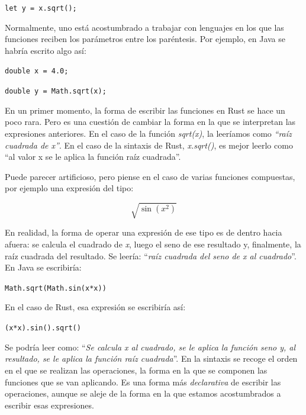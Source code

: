 {\vspace{-0.7em}\hspace{5em} \texttt{let y = x.sqrt();} \par}

Normalmente, uno está acostumbrado a trabajar con lenguajes en los que las funciones reciben los parámetros entre los paréntesis. Por ejemplo, en Java se habría escrito algo así:

{\hspace{5em} \texttt{double x = 4.0;} \par}

{\vspace{-0.7em}\hspace{5em} \texttt{double y = Math.sqrt(x);} \par}

En un primer momento, la forma de escribir las funciones en Rust se hace un poco rara. Pero es una cuestión de cambiar la forma en la que se interpretan las expresiones anteriores. En el caso de la función \textit{sqrt(x)}, la leeríamos como \textit{``raíz cuadrada de x''}. En el caso de la sintaxis de Rust, \textit{x.sqrt()}, es mejor leerlo como ``al valor x se le aplica la función raíz cuadrada''. 

Puede parecer artificioso, pero piense en el caso de varias funciones compuestas, por ejemplo una expresión del tipo:

\[\sqrt{\sin{(x^2)}}\]

En realidad, la forma de operar una expresión de ese tipo es de dentro hacia afuera: se calcula el cuadrado de \textit{x}, luego el seno de ese resultado y, finalmente, la raíz cuadrada del resultado. Se leería: ``\textit{raíz cuadrada del seno de x al cuadrado}''. En Java se escribiría:

{\centering \texttt{Math.sqrt(Math.sin(x*x))} \par}


En el caso de Rust, esa expresión se escribiría así:

{\centering \texttt{(x*x).sin().sqrt()} \par}
 
Se podría leer como: ``\textit{Se calcula x al cuadrado, se le aplica la función seno y, al resultado, se le aplica la función raíz cuadrada}''. En la sintaxis se recoge el orden en el que se realizan las operaciones, la forma en la que se componen las funciones que se van aplicando. Es una forma más \textit{declarativa} de escribir las operaciones, aunque se aleje de la forma en la que estamos acostumbrados a escribir esas expresiones.


